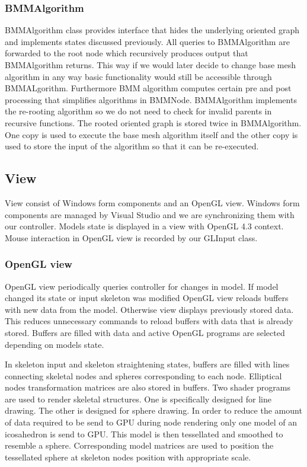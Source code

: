 \subsubsection{BMMAlgorithm}

BMMAlgorithm class provides interface that hides the underlying oriented graph and implements states discussed previously.
All queries to BMMAlgorithm are forwarded to the root node which recursively produces output that BMMAlgorithm returns.
This way if we would later decide to change base mesh algorithm in any way basic functionality would still be accessible through BMMALgorithm.
Furthermore BMM algorithm computes certain pre and post processing that simplifies algorithms in BMMNode.
BMMAlgorithm implements the re-rooting algorithm so we do not need to check for invalid parents in recursive functions.
The rooted oriented graph is stored twice in BMMAlgorithm.
One copy is used to execute the base mesh algorithm itself and the other copy is used to store the input of the algorithm so that it can be re-executed.

\subsection{View}

View consist of Windows form components and an OpenGL view.
Windows form components are managed by Visual Studio and we are synchronizing them with our controller.
Models state is displayed in a view with OpenGL 4.3 context.
Mouse interaction in OpenGL view is recorded by our GLInput class.

\subsubsection{OpenGL view}

OpenGL view periodically queries controller for changes in model.
If model changed its state or input skeleton was modified OpenGL view reloads buffers with new data from the model.
Otherwise view displays previously stored data.
This reduces unnecessary commands to reload buffers with data that is already stored.
Buffers are filled with data and active OpenGL programs are selected depending on models state.

In skeleton input and skeleton straightening states, buffers are filled with lines connecting skeletal nodes and spheres corresponding to each node.
Elliptical nodes transformation matrices are also stored in buffers.
Two shader programs are used to render skeletal structures.
One is specifically designed for line drawing.
The other is designed for sphere drawing.
In order to reduce the amount of data required to be send to GPU during node rendering only one model of an icosahedron is send to GPU.
This model is then tessellated and smoothed to resemble a sphere.
Corresponding model matrices are used to position the tessellated sphere at skeleton nodes position with appropriate scale.

